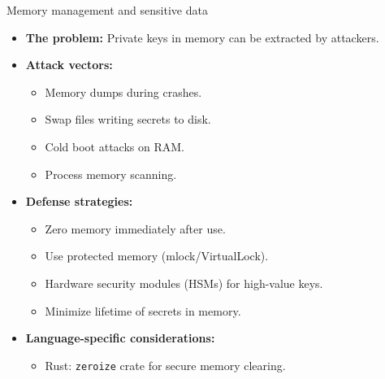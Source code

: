\documentclass[aspectratio=169, lualatex, handout]{beamer}
\begin{document}
\begin{frame}{Memory management and sensitive data}
	\begin{itemize}[<+->]
		\item \textbf{The problem:} Private keys in memory can be extracted by attackers.
		\item \textbf{Attack vectors:}
		      \begin{itemize}
			      \item Memory dumps during crashes.
			      \item Swap files writing secrets to disk.
			      \item Cold boot attacks on RAM.
			      \item Process memory scanning.
		      \end{itemize}
		\item \textbf{Defense strategies:}
		      \begin{itemize}
			      \item Zero memory immediately after use.
			      \item Use protected memory (mlock/VirtualLock).
			      \item Hardware security modules (HSMs) for high-value keys.
			      \item Minimize lifetime of secrets in memory.
		      \end{itemize}
		\item \textbf{Language-specific considerations:}
		      \begin{itemize}
			      \item Rust: \texttt{zeroize} crate for secure memory clearing.
		      \end{itemize}
	\end{itemize}
\end{frame}
\end{document}
